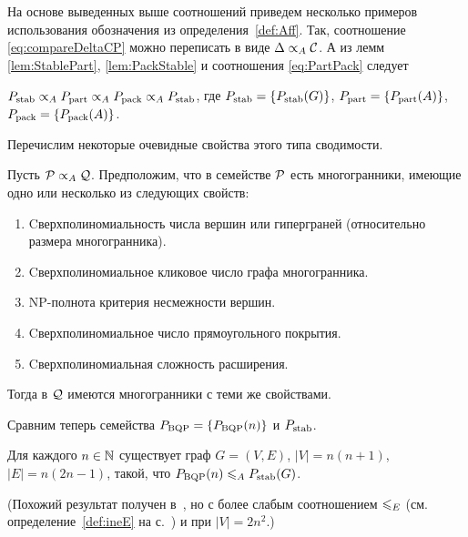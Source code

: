 На основе выведенных выше соотношений приведем несколько примеров использования обозначения из определения~\ref{def:Aff}.
Так, соотношение \eqref{eq:compareDeltaCP} можно переписать в виде $\Delta \propto_A {\mathcal C}$. 
А из лемм \ref{lem:StablePart}, \ref{lem:PackStable} и соотношения 	\eqref{eq:PartPack} следует
 
\begin{theorem}
	\label{thm:Class1}
	$P_{\textup{stab}} \propto_A P_{\textup{part}} \propto_A P_{\textup{pack}} \propto_A P_{\textup{stab}}$,
	где $P_{\textup{stab}} = \{P_{\textup{stab}}(G)\}$, $P_{\textup{part}} = \{P_{\textup{part}}(A)\}$, $P_{\textup{pack}} = \{P_{\textup{pack}}(A)\}$.
\end{theorem}

Перечислим некоторые очевидные свойства этого типа сводимости. 

\begin{prop}
	Пусть ${\mathcal P} \propto_A {\mathcal Q}$. 
	Предположим, что в семействе ${\mathcal P}$ есть многогранники, имеющие одно или несколько из следующих свойств:
	\begin{enumerate}
	\item Cверхполиномиальность числа вершин или гиперграней (относительно размера многогранника).
	\item Cверхполиномиальное кликовое число графа многогранника.
	\item NP-полнота критерия несмежности вершин.
	\item Cверхполиномиальное число прямоугольного покрытия.
	\item Cверхполиномиальная сложность расширения.
	\end{enumerate}
	\noindent
	Тогда в ${\mathcal Q}$ имеются многогранники с теми же свойствами.
\end{prop}

Сравним теперь семейства $P_{\textup{BQP}} = \{P_{\textup{BQP}}(n)\}$ и $P_{\textup{stab}}$.


\begin{theorem}
	\label{thm:BQPStable}
	Для каждого $n\in \mathbb{N}$ существует граф $G = (V,E)$, $|V| = n(n+1)$, $|E| = n(2n-1)$, такой, что
	$P_{\textup{BQP}}(n) \leqslant_A P_{\textup{stab}}(G)$.
\end{theorem}
(Похожий результат получен в~\cite{FioriniPokutta:2015}, но с более слабым соотношением $\leqslant_E$ (см. определение~\ref{def:ineE} на с.~\pageref{def:ineE}) и при $|V| = 2 n^2$.)

